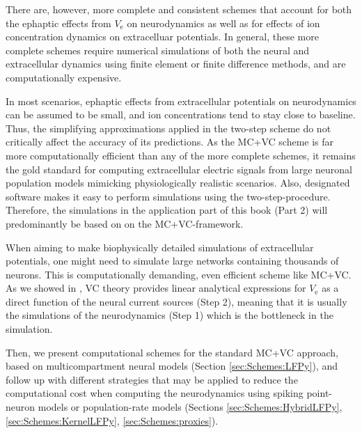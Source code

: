 There are, however, more complete and consistent schemes that account for both the ephaptic effects from $V_\mathrm{e}$  on neurodynamics as well as for effects of ion concentration dynamics on extracelluar potentials. 
In general, these more complete schemes require numerical simulations of both the neural and extracellular dynamics using finite element or finite difference methods, and are computationally expensive.

In most scenarios, ephaptic effects from extracellular potentials on neurodynamics can be assumed to be small, and ion concentrations tend to stay close to baseline. Thus, the simplifying approximations applied in the two-step scheme do not critically affect the accuracy of its predictions. As the MC+VC scheme is far more computationally efficient than any of the more complete schemes, it remains the gold standard for computing extracellular electric signals from large neuronal population models mimicking physiologically realistic scenarios. Also, designated software makes it easy to perform simulations using the two-step-procedure. Therefore, the simulations in the application part of this book (Part 2) will predominantly be based on on the MC+VC-framework.

When aiming to make biophysically detailed simulations of extracellular potentials, one might need to simulate large networks containing thousands of neurons. 
This is computationally demanding, even  efficient scheme like MC+VC.
 As we showed in , VC theory provides linear analytical expressions for $V_\mathrm{e}$  as a direct function of the neural current sources (Step 2), meaning that it is usually the simulations of the neurodynamics (Step 1) which is the bottleneck in the simulation. 

Then, we present computational schemes for the standard MC+VC approach, based on multicompartment neural models (Section \ref{sec:Schemes:LFPy}), and follow up with different strategies that may be applied to reduce the computational cost when computing the neurodynamics using spiking point-neuron models or population-rate models (Sections \ref{sec:Schemes:HybridLFPy}, \ref{sec:Schemes:KernelLFPy}, \ref{sec:Schemes:proxies}). 


